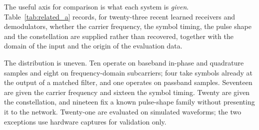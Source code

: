 \documentclass[journal]{IEEEtran}   %
\begin{document}
The useful axis for comparison is what each system is \emph{given}.
Table~\ref{tab:related_a} records, for twenty-three recent learned receivers and
demodulators, whether the carrier frequency, the symbol timing, the pulse shape
and the constellation are supplied rather than recovered, together with the
domain of the input and the origin of the evaluation data.

The distribution is uneven. Ten operate on baseband in-phase and quadrature
samples and eight on frequency-domain subcarriers; four take symbols already at
the output of a matched filter, and one operates on passband samples.
Seventeen are given the carrier frequency and sixteen the symbol timing. Twenty
are given the constellation, and nineteen fix a known pulse-shape family without
presenting it to the network. Twenty-one are evaluated on simulated waveforms;
the two exceptions use hardware captures for validation only.
\end{document}
